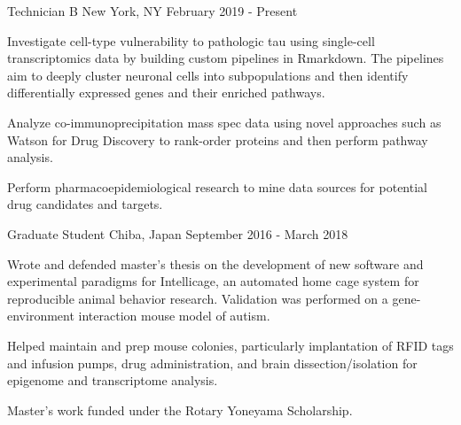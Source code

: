 %
%
%

\vspace*{0.35cm}

\begin{cventries}

    {Technician B}
    {New York, NY}
    {February 2019 - Present}
    {\begin{cvitems}
        \item{Investigate cell-type vulnerability to pathologic tau using single-cell
            transcriptomics data by building custom pipelines in Rmarkdown. The
            pipelines aim to deeply cluster neuronal cells into subpopulations and then
            identify differentially expressed genes and their enriched pathways.
            \vspace*{0.1cm}}
        \item{Analyze co-immunoprecipitation mass spec data using novel approaches such
            as Watson for Drug Discovery to rank-order proteins and then perform
            pathway analysis.\vspace*{0.1cm}}
        \item{Perform pharmacoepidemiological research to mine data sources for potential
            drug candidates and targets.}
    \end{cvitems}}
    \vspace*{0.2cm}

    {Graduate Student}
    {Chiba, Japan}
    {September 2016 - March 2018}
    {\begin{cvitems}
        \item{Wrote and defended master's thesis on the development of new software and experimental paradigms for Intellicage, an automated home cage system for reproducible animal behavior research. Validation was performed on a gene-environment interaction mouse model of autism.\vspace*{0.1cm}}
        \item{Helped maintain and prep mouse colonies, particularly implantation of RFID tags and infusion pumps, drug administration, and brain dissection/isolation for epigenome and transcriptome analysis.\vspace*{0.1cm}}
        \item{Master's work funded under the Rotary Yoneyama Scholarship.}
    \end{cvitems}}
    \vspace*{0.2cm}
    

\end{cventries}

